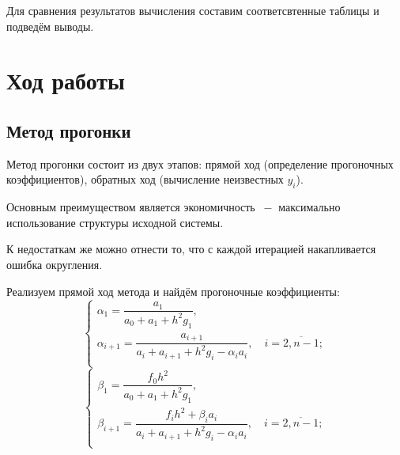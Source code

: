 \documentclass[a4paper,12pt]{article}
\begin{document}
{Для сравнения результатов вычисления составим соответсвтенные таблицы и подведём выводы.
\section{Ход работы}
\subsection{Метод прогонки}
\hspace*{1.25cm} Метод прогонки состоит из двух этапов: прямой ход (определение прогоночных коэффициентов), 
обратных ход (вычисление неизвестных $y_i$).

Основным преимуществом является экономичность $~-$ максимально использование структуры исходной системы.

К недостаткам же можно отнести то, что с каждой итерацией накапливается ошибка округления.


Реализуем прямой ход метода и найдём прогоночные коэффициенты:
\begin{equation}
    \begin{cases}
        \alpha_1 = \dfrac{a_1}{a_0 + a_1 + h^2g_1},\\
        \alpha_{i+1} = \dfrac{a_{i+1}}{a_i + a_{i+1} + h^2g_i - \alpha_ia_i}, \quad i = \overline{2, n - 1};\\
    \end{cases}
\end{equation}
\begin{equation}
    \begin{cases}
        \beta_1 = \dfrac{f_0h^2}{a_0 + a_1 + h^2g_1},\\
        \beta_{i+1} = \dfrac{f_ih^2 + \beta_ia_i}{a_i + a_{i+1} + h^2g_i - \alpha_ia_i}, \quad i = \overline{2, n - 1};\\
    \end{cases}
\end{equation}

}
\end{document}
